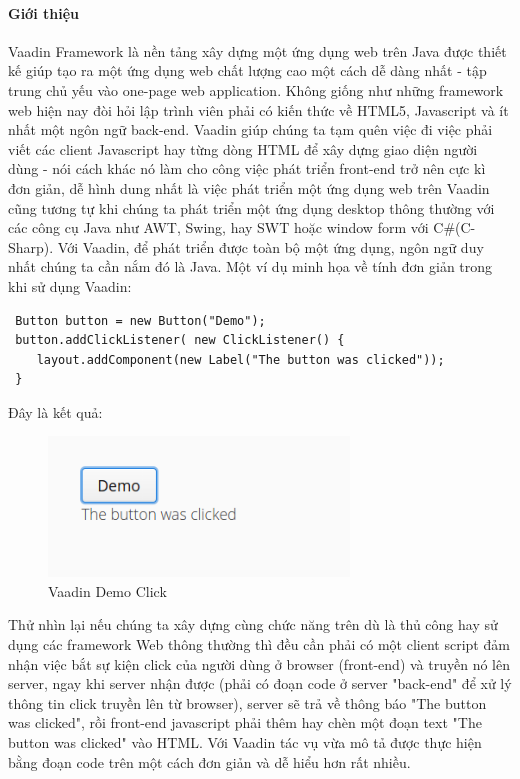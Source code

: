 \paragraph{Giới thiệu} Vaadin Framework là nền tảng xây dựng một ứng dụng web trên Java được thiết kế giúp tạo ra một ứng dụng web chất lượng cao một cách dễ dàng nhất - tập trung chủ yếu vào one-page web application. Không giống như những framework web hiện nay đòi hỏi lập trình viên phải có kiến thức về HTML5, Javascript và ít nhất một ngôn ngữ back-end. Vaadin giúp chúng ta tạm quên việc đi việc phải viết các client Javascript hay từng dòng HTML để xây dựng giao diện người dùng - nói cách khác nó làm cho công việc phát triển front-end trở nên cực kì đơn giản, dễ hình dung nhất là việc phát triển một ứng dụng web trên Vaadin cũng tương tự khi chúng ta phát triển một ứng dụng desktop thông thường với các công cụ Java như AWT, Swing, hay SWT hoặc window form với C#(C-Sharp).  Với Vaadin, để phát triển được toàn bộ một ứng dụng, ngôn ngữ duy nhất chúng ta cần nắm đó là Java. Một ví dụ minh họa về tính đơn giản trong khi sử dụng Vaadin:
\begin{verbatim}
 Button button = new Button("Demo");
 button.addClickListener( new ClickListener() {
    layout.addComponent(new Label("The button was clicked"));
 }
\end{verbatim}
Đây là kết quả:
\begin{figure}[H]
 	\centering
 	\includegraphics[width=80mm]{Figures/vaadin_democlick.png}
 	\caption{Vaadin Demo Click\label{overflow}}
\end{figure}
Thử nhìn lại nếu chúng ta xây dựng cùng chức năng trên dù là thủ công hay sử dụng các framework Web thông thường thì đều cần phải có một client script đảm nhận việc bắt sự kiện click của người dùng ở browser (front-end) và truyền nó lên server, ngay khi server nhận được (phải có đoạn code ở server "back-end" để xử lý thông tin click truyền lên từ browser), server sẽ trả về thông báo "The button was clicked", rồi front-end javascript phải thêm hay chèn một đoạn text "The button was clicked" vào HTML. Với Vaadin tác vụ vừa mô tả được thực hiện bằng đoạn code trên một cách đơn giản và dễ hiểu hơn rất nhiều.
